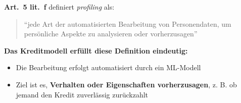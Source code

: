 \begin{aufgabe}{2}
\textbf{Art.\ 5 lit.\ f} definiert \textit{profiling} als:
\begin{quote}
``jede Art der automatisierten Bearbeitung von Personendaten, um persönliche Aspekte zu analysieren oder vorherzusagen''
\end{quote}

\textbf{Das Kreditmodell erfüllt diese Definition eindeutig:}
\begin{itemize}
  \item Die Bearbeitung erfolgt automatisiert durch ein ML-Modell
  \item Ziel ist es, \textbf{Verhalten oder Eigenschaften vorherzusagen}, z. B. ob jemand den Kredit zuverlässig zurückzahlt
\end{itemize}

\end{aufgabe}


